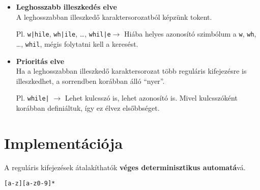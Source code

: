 \begin{itemize}
	\item \textbf{Leghosszabb illeszkedés elve}\\
	A leghosszabban illeszkedő karaktersorozatból képzünk tokent.
	
	Pl. \texttt{w|hile}, \texttt{wh|ile}, \dots, \texttt{whil|e}$\to$ Hiába helyes azonosító szimbólum a \texttt{w}, \texttt{wh}, \dots, \texttt{whil}, mégis folytatni kell a keresést.
	
	\item \textbf{Prioritás elve} \\
	Ha a leghosszabban illeszkedő karaktersorozat több reguláris kifejezésre is illeszkedhet, a sorrendben korábban álló ``nyer''.
	
	Pl. \texttt{while|} $\to$ Lehet kulcsszó is, lehet azonosító is. Mivel kulcsszóként korábban definiáltuk, így ez élvez elsőbbséget.
\end{itemize}

\section{Implementációja}

A reguláris kifejezések átalakíthatók \textbf{véges determinisztikus automatá}vá.

\tikzset{
	->, %
	node distance=3cm, %
	initial text=$ $ %
}

\begin{minipage}{0.33\linewidth}
	\begin{center}
		\texttt{[a-z][a-z0-9]*}
	\end{center}
\end{minipage}
\begin{minipage}{0.66\linewidth}
\end{minipage}

